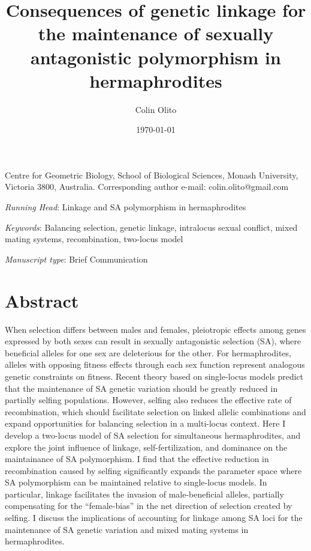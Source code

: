 \documentclass{article}
\title{Consequences of genetic linkage for the maintenance of sexually antagonistic polymorphism in hermaphrodites}
\author{Colin Olito}
\date{\today}
\begin{document}
\maketitle


\noindent{} Centre for Geometric Biology, School of Biological Sciences, Monash University, Victoria 3800, Australia.
\noindent{} Corresponding author e-mail: colin.olito@gmail.com

\bigskip

\noindent{} \textit{Running Head}: Linkage and SA polymorphism in hermaphrodites

\bigskip

\noindent{} \textit{Keywords}: Balancing selection, genetic linkage, intralocus sexual conflict, mixed mating systems, recombination, two-locus model

\bigskip

\noindent{} \textit{Manuscript type}: Brief Communication

\bigskip


\linenumbers
\modulolinenumbers[1]
\renewcommand\linenumberfont{\normalfont\small}


\newpage{}
\section*{Abstract}

\noindent{} When selection differs between males and females, pleiotropic effects among genes expressed by both sexes can result in sexually antagonistic selection (SA), where beneficial alleles for one sex are deleterious for the other. For hermaphrodites, alleles with opposing fitness effects through each sex function represent analogous genetic constraints on fitness. Recent theory based on single-locus models predict that the maintenance of SA genetic variation should be greatly reduced in partially selfing populations. However, selfing also reduces the effective rate of recombination, which should facilitate selection on linked allelic combinations and expand opportunities for balancing selection in a multi-locus context. Here I develop a two-locus model of SA selection for simultaneous hermaphrodites, and explore the joint influence of linkage, self-fertilization, and dominance on the maintainance of SA polymorphism. I find that the effective reduction in recombination caused by selfing significantly expands the parameter space where SA polymorphism can be maintained relative to single-locus models. In particular, linkage facilitates the invasion of male-beneficial alleles, partially compensating for the ``female-bias'' in the net direction of selection created by selfing. I discuss the implications of accounting for linkage among SA loci for the maintenance of SA genetic variation and mixed mating systems in hermaphrodites.
\end{document}
